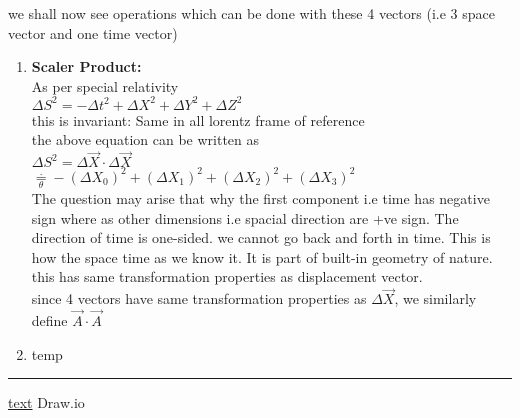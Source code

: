 \documentclass[11pt,a4paper]{article}
\begin{document}
\begin{enumerate}
\begin{enumerate}
                    we shall now see operations which can be done with these 4 vectors (i.e 3 space vector and one time vector)
                    \begin{enumerate}
                        \item \textbf{Scaler Product:}\\
                              As per special relativity\\
                              $\Delta{S^2}=-\Delta{t^2}+\Delta{X^2}+\Delta{Y^2}+\Delta{Z^2}$\\
                              this is invariant: Same in all lorentz frame of reference\\
                              the above equation can be written as\\
                              $\Delta{S^2} = \Delta \vec{X} \cdot \Delta\vec{X}$\\
                              $\mathop = \limits^{.}_{\theta}  -(\Delta{X_0})^2+(\Delta{X_1})^2+(\Delta{X_2})^2+(\Delta{X_3})^2$\\
                              The question may arise that why the first component i.e time has negative sign where as other dimensions i.e spacial direction are +ve sign. The direction of time is one-sided. we cannot go back and forth in time. This is how the space time as we know it. It is part of built-in geometry of nature.\\
                              this has same transformation properties as displacement vector.\\
                              since 4 vectors have same transformation properties as $\Delta \vec{X}$, we similarly define $\vec{A}\cdot\vec{A}$

                        \item temp
                    \end{enumerate}
          \end{enumerate}
\end{enumerate}
\noindent\rule{\textwidth}{1pt}
\href{https://youtu.be/TiHHz3sKDbY?list=PL6Q1107aDr%SgQ1DBEugejXLfQX76hfSnX&t=1188}{text} Draw.io
\end{document}

